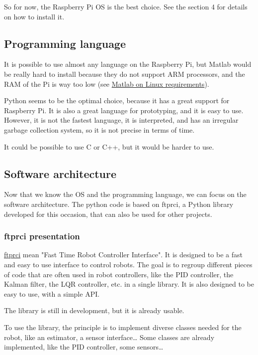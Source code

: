 \documentclass{article}
\begin{document}
So for now, the Raspberry Pi OS is the best choice.
See the section 4 for details on how to install it.

\subsection{Programming language}

It is possible to use almost any language on the Raspberry Pi, but Matlab would be really hard
to install because they do not support ARM processors, and the RAM of the Pi is way too low (see
\href{https://fr.mathworks.com/support/requirements/matlab-linux.html}{Matlab on Linux requirements}).

Python seems to be the optimal choice, because it has a great support for Raspberry Pi.
It is also a great language for prototyping, and it is easy to use.
However, it is not the fastest language, it is interpreted, and has an irregular garbage
collection system, so it is not precise in terms of time.

It could be possible to use C or C++, but it would be harder to use.

\subsection{Software architecture}

Now that we know the OS and the programming language, we can focus on the software architecture.
The python code is based on ftprci, a Python library developed for this occasion, that can also
be used for other projects.

\subsubsection{ftprci presentation}
\href{https://github.com/Ekter/ftprci}{ftprci} mean "Fast Time Robot Controller Interface". It is designed to be a fast and easy to use
interface to control robots. The goal is to regroup different pieces of code that are often used
in robot controllers, like the PID controller, the Kalman filter, the LQR controller, etc. in a
single library. It is also designed to be easy to use, with a simple API.

The library is still in development, but it is already usable.

To use the library, the principle is to implement diverse classes needed for the robot, like an
estimator, a sensor interface\dots
Some classes are already implemented, like the PID controller, some sensors\dots
\end{document}
